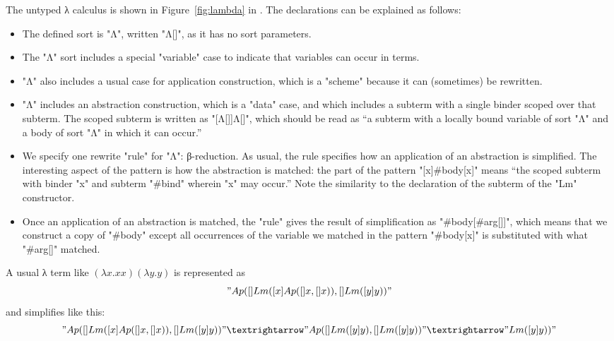 \documentclass[letterpaper,11pt]{article}
\begin{document}
\begin{example}\label{ex:lambda}
  The untyped λ calculus is shown in Figure~\ref{fig:lambda} in \hax.  The declarations can be
  explained as follows:
  \begin{itemize}

  \item The defined sort is "Λ", written "Λ[]", as it has no sort parameters.

  \item The "Λ" sort includes a special "variable" case to indicate that variables can occur in
    terms.

  \item "Λ" also includes a usual case for application construction, which is a "scheme" because it
    can (sometimes) be rewritten.

  \item "Λ" includes an abstraction construction, which is a "data" case, and which includes a
    subterm with a single binder scoped over that subterm. The scoped subterm is written as
    "[Λ[]]Λ[]", which should be read as ``a subterm with a locally bound variable of sort "Λ" and a
    body of sort "Λ" in which it can occur.''

  \item We specify one rewrite "rule" for "Λ": β-reduction. As usual, the rule specifies how an
    application of an abstraction is simplified. The interesting aspect of the pattern is how the
    abstraction is matched: the part of the pattern "[x]#body[x]" means ``the scoped subterm with
    binder "x" and subterm "#bind" wherein "x" may occur.'' Note the similarity to the declaration
    of the subterm of the "Lm" constructor.

  \item Once an application of an abstraction is matched, the "rule" gives the result of
    simplification as "#body[#arg[]]", which means that we construct a copy of "#body" except all
    occurrences of the variable we matched in the pattern "#body[x]" is substituted with what
    "#arg[]" matched.

  \end{itemize}
  A usual λ term like $(λx.x x)(λy.y)$ is represented as
  \begin{displaymath}
    "Ap([]Lm([x]Ap([]x, []x)), []Lm([y]y))"    
  \end{displaymath}
  and simplifies like this:
  \begin{displaymath}
    "Ap([]Lm([x]Ap([]x, []x)), []Lm([y]y))" →
    "Ap([]Lm([y]y), []Lm([y]y))" →
    "Lm([y]y))"
  \end{displaymath}
\end{example}
\end{document}
